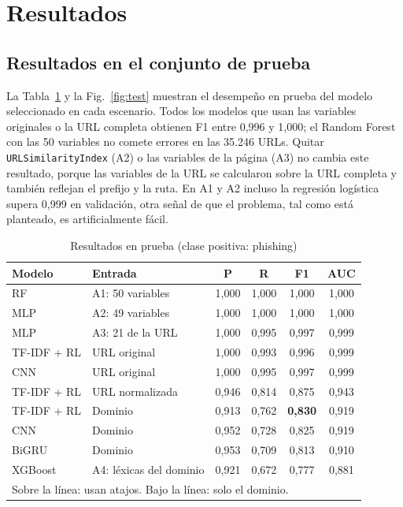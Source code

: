 \section{Resultados}

\subsection{Resultados en el conjunto de prueba}
La Tabla~\ref{tab:test} y la Fig.~\ref{fig:test} muestran el desempeño en prueba del modelo seleccionado en cada escenario. Todos los modelos que usan las variables originales o la URL completa obtienen F1 entre 0,996 y 1,000; el Random Forest con las 50 variables no comete errores en las 35.246 URLs. Quitar \texttt{URLSimilarityIndex} (A2) o las variables de la página (A3) no cambia este resultado, porque las variables de la URL se calcularon sobre la URL completa y también reflejan el prefijo y la ruta. En A1 y A2 incluso la regresión logística supera 0,999 en validación, otra señal de que el problema, tal como está planteado, es artificialmente fácil.

\begin{table}[t]
\caption{Resultados en prueba (clase positiva: phishing)}
\label{tab:test}
\centering
\setlength{\tabcolsep}{4pt}
\begin{tabular}{llcccc}
\toprule
Modelo & Entrada & P & R & F1 & AUC \\
\midrule
RF & A1: 50 variables & 1,000 & 1,000 & 1,000 & 1,000 \\
MLP & A2: 49 variables & 1,000 & 1,000 & 1,000 & 1,000 \\
MLP & A3: 21 de la URL & 1,000 & 0,995 & 0,997 & 0,999 \\
TF-IDF + RL & URL original & 1,000 & 0,993 & 0,996 & 0,999 \\
CNN & URL original & 1,000 & 0,995 & 0,997 & 0,999 \\
TF-IDF + RL & URL normalizada & 0,946 & 0,814 & 0,875 & 0,943 \\
\midrule
TF-IDF + RL & Dominio & 0,913 & 0,762 & \textbf{0,830} & 0,919 \\
CNN & Dominio & 0,952 & 0,728 & 0,825 & 0,919 \\
BiGRU & Dominio & 0,953 & 0,709 & 0,813 & 0,910 \\
XGBoost & A4: léxicas del dominio & 0,921 & 0,672 & 0,777 & 0,881 \\
\bottomrule
\multicolumn{6}{l}{\footnotesize Sobre la línea: usan atajos. Bajo la línea: solo el dominio.}
\end{tabular}
\end{table}

